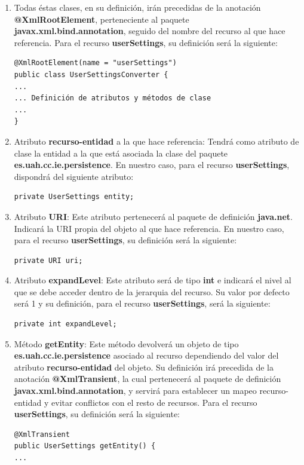 \begin{enumerate}
\item Todas éstas clases, en su definición, irán precedidas de la anotación \textbf{@XmlRootElement}, perteneciente al paquete \textbf{javax.xml.bind.annotation}, seguido del nombre del recurso al que hace referencia. Para el recurso \textbf{userSettings}, su definición será la siguiente:
\begin{verbatim}
@XmlRootElement(name = "userSettings")
public class UserSettingsConverter {
...
... Definición de atributos y métodos de clase
...
}
\end{verbatim} 
\item Atributo \textbf{recurso-entidad} a la que hace referencia: Tendrá como atributo de clase la entidad a la que está asociada la clase del paquete \textbf{es.uah.cc.ie.persistence}. En nuestro caso, para el recurso \textbf{userSettings}, dispondrá del siguiente atributo: \begin{verbatim}private UserSettings entity;\end{verbatim}
\item Atributo \textbf{URI}: Este atributo pertenecerá al paquete de definición \textbf{java.net}. Indicará la URI propia del objeto al que hace referencia. En nuestro caso, para el recurso \textbf{userSettings}, su definición será la siguiente: \begin{verbatim}private URI uri;\end{verbatim}
\item Atributo \textbf{expandLevel}: Este atributo será de tipo \textbf{int} e indicará el nivel al que se debe acceder dentro de la jerarquia del recurso. Su valor por defecto será 1 y su definición, para el recurso \textbf{userSettings}, será la siguiente:\begin{verbatim}private int expandLevel;\end{verbatim}
\item Método \textbf{getEntity}: Este método devolverá un objeto de tipo \textbf{es.uah.cc.ie.persistence} asociado al recurso dependiendo del valor del atributo \textbf{recurso-entidad} del objeto. Su definición irá precedida de la anotación \textbf{@XmlTransient}, la cual pertenecerá al paquete de definición \textbf{javax.xml.bind.annotation}, y servirá para establecer un mapeo recurso-entidad y evitar conflictos con el resto de recursos. Para el recurso \textbf{userSettings}, su definición será la siguiente:
\begin{verbatim}
@XmlTransient
public UserSettings getEntity() {
...

\end{verbatim}
\end{enumerate}
